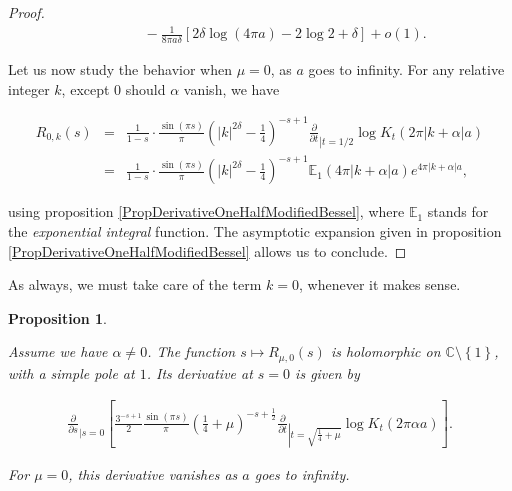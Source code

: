 \documentclass{jams-l}
\newtheorem{proposition}[theorem]{Proposition}
\theoremstyle{definition}
\theoremstyle{remark}
\numberwithin{equation}{section}
\begin{document}
\begin{proof}
\[\begin{array}{lll}
                        && \scriptstyle \qquad - \frac{1}{8 \pi a \delta} \left[ 2 \delta \log \left( 4 \pi a \right) - 2 \log 2 + \delta \right] + o \left( 1 \right).
                    \end{array} \]
                
                \noindent Let us now study the behavior when $\mu = 0$, as $a$ goes to infinity. For any relative integer $k$, except $0$ should $\alpha$ vanish, we have
                
                \[ \begin{array}{lll}
                        R_{0,k} \left( s \right) & = & \frac{1}{1-s} \cdot \frac{\sin \left( \pi s \right)}{\pi} \left( \left \vert k \right \vert^{2 \delta} - \frac{1}{4} \right)^{-s + 1} \frac{\partial}{\partial t}_{\left \vert t = 1/2 \right.} \log K_t \left( 2 \pi \left \vert k + \alpha \right \vert a \right) \\[1em]
                        
                        & = & \frac{1}{1-s} \cdot \frac{\sin \left( \pi s \right)}{\pi} \left( \left \vert k \right \vert^{2 \delta} - \frac{1}{4} \right)^{-s + 1} \mathbb{E}_1 \left( 4 \pi \left \vert k + \alpha \right \vert a \right) e^{4 \pi \left \vert k + \alpha \right \vert a},
                    \end{array} \]
                
                \noindent using proposition \ref{PropDerivativeOneHalfModifiedBessel}, where $\mathbb{E}_1$ stands for the \textit{exponential integral} function. The asymptotic expansion given in proposition \ref{PropDerivativeOneHalfModifiedBessel} allows us to conclude.
            
            \end{proof}

            As always, we must take care of the term $k = 0$, whenever it makes sense.
            
            \begin{proposition}
            \label{PropR-0}
            
                Assume we have $\alpha \neq 0$. The function $s \longmapsto R_{\mu,0} \left( s \right)$ is holomorphic on $\mathbb{C} \setminus \left \{ 1 \right \}$, with a simple pole at $1$. Its derivative at $s=0$ is given by
                
                \[ \begin{array}{c}
                        \frac{\partial}{\partial s}_{\left \vert s = 0 \right.} \left[ \frac{3^{-s+1}}{2} \frac{\sin \left( \pi s \right)}{\pi} \left( \frac{1}{4} + \mu \right)^{- s + \frac{1}{2}} \frac{\partial}{\partial t}_{\left \vert t = \sqrt{\frac{1}{4} + \mu} \right.} \log K_t \left( 2 \pi \alpha a \right) \right].
                    \end{array} \]
                
                \noindent For $\mu = 0$, this derivative vanishes as $a$ goes to infinity.
            
            \end{proposition}
            
\end{document}
